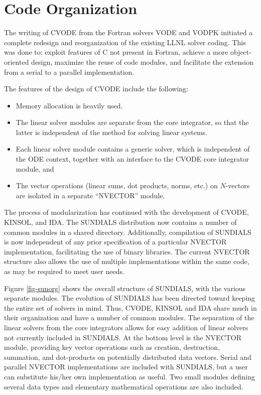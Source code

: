 \section{Code Organization}
\label{s:organization}

The writing of CVODE from the Fortran solvers VODE and VODPK initiated a
complete redesign and reorganization of the existing LLNL  solver coding.
This was done to: exploit features of C not present in Fortran,
achieve a more object-oriented design, maximize the reuse of code
modules, and facilitate the extension from a serial to a parallel
implementation.

The features of the design of CVODE include the following:
\begin{itemize}
\item Memory allocation is heavily used.
\item The linear solver modules are separate from the core integrator,
so that the latter is independent of the method for solving linear
systems.
\item Each linear solver module contains  a generic solver, which is
independent of the ODE context, together with an interface to the CVODE core
integrator module, and 
\item The vector operations  (linear sums, dot products, norms, etc.) on
$N$-vectors are isolated in a separate ``NVECTOR'' module.
\end{itemize}

The process of modularization has continued with the development of CVODE,
KINSOL, and IDA. The SUNDIALS distribution now contains a number of common
modules in a shared directory. Additionally, compilation of SUNDIALS is now
independent of any prior specification of a particular NVECTOR
implementation, facilitating the use of binary libraries. The current
NVECTOR structure also allows the use of multiple implementations within the
same code, as may be required to meet user needs.

Figure \ref{fig-sunorg} shows the overall structure of SUNDIALS, with the
various separate modules. The evolution of SUNDIALS has been directed toward
keeping the entire set of solvers in mind. Thus, CVODE, KINSOL and IDA share
much in their organization and have a number of common modules.  The
separation of the linear solvers from the core integrators allows for easy
addition of linear solvers not currently included in SUNDIALS. At the bottom
level is the NVECTOR module, providing key vector operations such as
creation, destruction, summation, and dot-products on potentially
distributed data vectors. Serial and parallel NVECTOR implementations are
included with SUNDIALS, but a user can substitute his/her own implementation
as useful. Two small modules defining several data types and elementary
mathematical operations are also included.

